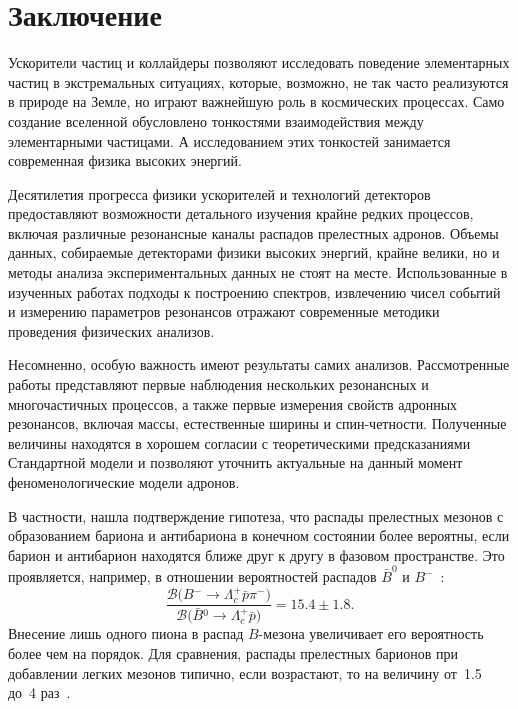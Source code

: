 \documentclass[a4paper, 12pt]{article}
\def\-{\nobreakdash-\hspace{0pt}}
\begin{document}

\clearpage
{}
{}
\section*{Заключение}

Ускорители частиц и коллайдеры позволяют исследовать поведение 
элементарных частиц в экстремальных ситуациях, которые, возможно, не так 
часто реализуются в природе на Земле, но играют важнейшую роль 
в космических процессах. Само создание вселенной обусловлено тонкостями 
взаимодействия между элементарными частицами. А исследованием этих 
тонкостей занимается современная физика высоких энергий.

Десятилетия прогресса физики ускорителей и технологий детекторов 
предоставляют возможности детального изучения крайне редких процессов, 
включая различные резонансные каналы распадов прелестных адронов. 
Объемы данных, собираемые детекторами физики высоких энергий, крайне 
велики, но и методы анализа экспериментальных данных не стоят на месте.
%
Использованные в изученных работах подходы к построению спектров, 
извлечению чисел событий и измерению параметров резонансов отражают 
современные методики проведения физических анализов.

Несомненно, особую важность имеют результаты самих анализов. 
Рассмотренные работы представляют первые наблюдения нескольких 
резонансных и многочастичных процессов, а также первые измерения свойств 
адронных резонансов, включая массы, естественные ширины и спин\-четности.
%
Полученные величины находятся в хорошем согласии с теоретическими 
предсказаниями Стандартной модели и позволяют уточнить актуальные на 
данный момент феноменологические модели адронов.

В частности, нашла подтверждение гипотеза, что распады прелестных 
мезонов с образованием бариона и антибариона в конечном состоянии более 
вероятны, если барион и антибарион находятся ближе друг к другу 
в фазовом пространстве. Это проявляется, например, в отношении 
вероятностей распадов $\bar{B}^0$ и $B^-$~\cite{2-babar-sc}:
\[
  \frac{\mathcal{B} \big( {B}{}^- \to \Lambda_c^+ \bar{p} \pi^- \big)}
  {\mathcal{B} \big( \bar{B}{}^0 \to \Lambda_c^+ \bar{p} \big)} =
  15.4 \pm 1.8.
\]
Внесение лишь одного пиона в распад $B$\-мезона увеличивает его 
вероятность более чем на порядок. Для сравнения, распады прелестных 
барионов при добавлении легких мезонов типично, если возрастают, то на 
величину от~1.5 до~4 раз~\cite{pdg}.
\end{document}
